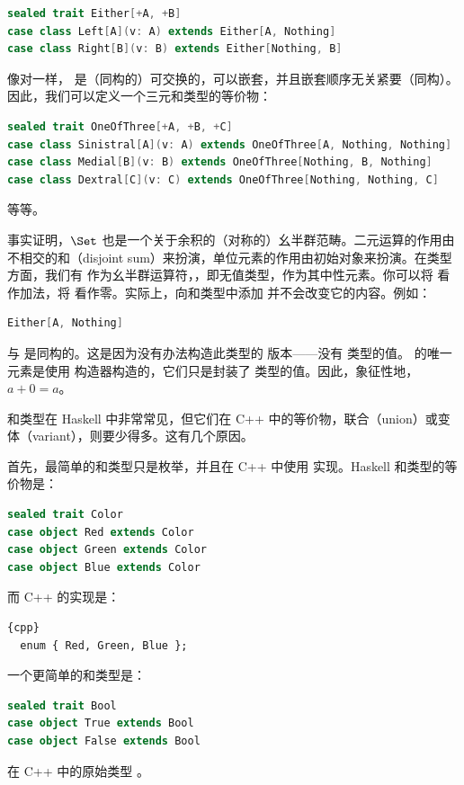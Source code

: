 \begin{lstlisting}[language=Scala]
sealed trait Either[+A, +B]
case class Left[A](v: A) extends Either[A, Nothing]
case class Right[B](v: B) extends Either[Nothing, B]
\end{lstlisting}
像对一样， 是（同构的）可交换的，可以嵌套，并且嵌套顺序无关紧要（同构）。因此，我们可以定义一个三元和类型的等价物：

\begin{lstlisting}[language=Scala]
sealed trait OneOfThree[+A, +B, +C]
case class Sinistral[A](v: A) extends OneOfThree[A, Nothing, Nothing]
case class Medial[B](v: B) extends OneOfThree[Nothing, B, Nothing]
case class Dextral[C](v: C) extends OneOfThree[Nothing, Nothing, C]
\end{lstlisting}
等等。

事实证明，$\Set$ 也是一个关于余积的（对称的）幺半群范畴。二元运算的作用由不相交的和（disjoint sum）来扮演，单位元素的作用由初始对象来扮演。在类型方面，我们有  作为幺半群运算符，，即无值类型，作为其中性元素。你可以将  看作加法，将  看作零。实际上，向和类型中添加  并不会改变它的内容。例如：

\begin{lstlisting}[language=Scala]
Either[A, Nothing]
\end{lstlisting}
与  是同构的。这是因为没有办法构造此类型的  版本——没有  类型的值。 的唯一元素是使用  构造器构造的，它们只是封装了  类型的值。因此，象征性地，$a + 0 = a$。

和类型在 Haskell 中非常常见，但它们在 C++ 中的等价物，联合（union）或变体（variant），则要少得多。这有几个原因。

首先，最简单的和类型只是枚举，并且在 C++ 中使用  实现。Haskell 和类型的等价物是：

\begin{lstlisting}[language=Scala]
sealed trait Color
case object Red extends Color
case object Green extends Color
case object Blue extends Color
\end{lstlisting}
而 C++ 的实现是：

\begin{lstlisting}{cpp}
  enum { Red, Green, Blue };
\end{lstlisting}
一个更简单的和类型是：

\begin{lstlisting}[language=Scala]
sealed trait Bool
case object True extends Bool
case object False extends Bool
\end{lstlisting}
在 C++ 中的原始类型 。


